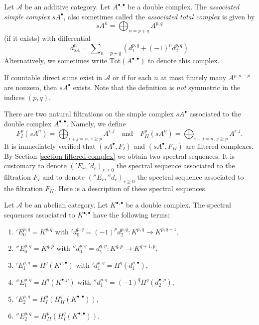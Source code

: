 \begin{definition}
\label{definition-associated-simple-complex}
Let $\mathcal{A}$ be an additive category.
Let $A^{\bullet, \bullet}$ be a double complex.
The {\it associated simple complex $sA^\bullet$}, also
sometimes called the {\it associated total complex} is
given by
$$
sA^n = \bigoplus\nolimits_{n = p + q} A^{p, q}
$$
(if it exists) with differential
$$
d_{sA}^n = \sum\nolimits_{n = p + q} (d_1^{p, q} + (-1)^p d_2^{p, q})
$$
Alternatively, we sometimes write $\text{Tot}(A^{\bullet, \bullet})$
to denote this complex.
\end{definition}

\noindent
If countable direct sums exist in $\mathcal{A}$ or if for each $n$ at most
finitely many $A^{p, n - p}$ are nonzero, then $sA^\bullet$ exists. Note that
the definition is {\it not} symmetric in the indices $(p, q)$.

\medskip\noindent
There are two natural filtrations on the simple complex $sA^\bullet$
associated to the double complex $A^{\bullet, \bullet}$. Namely, we
define
$$
F_I^p(sA^n) = \bigoplus\nolimits_{i + j = n, \ i \geq p} A^{i, j}
\quad
\text{and}
\quad
F_{II}^p(sA^n) = \bigoplus\nolimits_{i + j = n, \ j \geq p} A^{i, j}.
$$
It is immediately verified that $(sA^\bullet, F_I)$ and
$(sA^\bullet, F_{II})$ are filtered complexes.
By Section \ref{section-filtered-complex}
we obtain two spectral sequences. It is customary to
denote $({}'E_r, {}'d_r)_{r \geq 0}$ the spectral sequence associated
to the filtration $F_I$ and to denote $({}''E_r, {}''d_r)_{r \geq 0}$
the spectral sequence associated to the filtration $F_{II}$.
Here is a description of these spectral sequences.

\begin{lemma}
\label{lemma-ss-double-complex}
Let $\mathcal{A}$ be an abelian category.
Let $K^{\bullet, \bullet}$ be a double complex.
The spectral sequences associated to $K^{\bullet, \bullet}$
have the following terms:
\begin{enumerate}
\item ${}'E_0^{p, q} = K^{p, q}$ with
${}'d_0^{p, q} = (-1)^p d_2^{p, q} : K^{p, q} \to K^{p, q + 1}$,
\item ${}''E_0^{p, q} = K^{q, p}$ with
${}''d_0^{p, q} = d_1^{q, p} : K^{q, p} \to K^{q + 1, p}$,
\item ${}'E_1^{p, q} = H^q(K^{p, \bullet})$ with
${}'d_1^{p, q} = H^q(d_1^{p, \bullet})$,
\item ${}''E_1^{p, q} = H^q(K^{\bullet, p})$ with
${}''d_1^{p, q} = (-1)^q H^q(d_2^{\bullet, p})$,
\item ${}'E_2^{p, q} = H^p_I(H^q_{II}(K^{\bullet, \bullet}))$,
\item ${}''E_2^{p, q} = H^p_{II}(H^q_I(K^{\bullet, \bullet}))$.
\end{enumerate}
\end{lemma}

